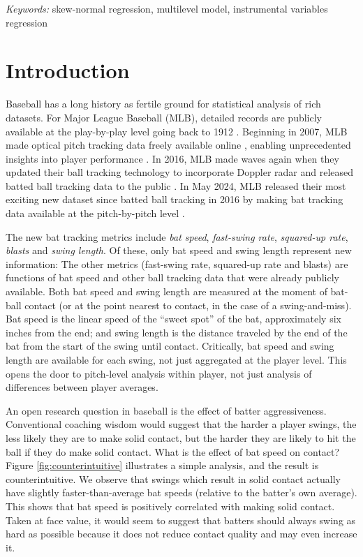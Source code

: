 \documentclass[
  12pt]{article}
\begin{document}
\noindent%
{\it Keywords:} skew-normal regression, multilevel model, instrumental variables regression
\vfill

\newpage
{} %


  \section{Introduction}
  \label{sec:introduction}

    Baseball has a long history as fertile ground for statistical analysis of rich datasets. For Major League Baseball (MLB), detailed records are publicly available at the play-by-play level going back to 1912 \citep{retrosheet_retrosheet_2025}. Beginning in 2007, MLB made optical pitch tracking data freely available online
    \citep{fast_what_2010}, enabling unprecedented insights into player performance \citep{swartz_quality_2017}. In 2016, MLB made waves again when they updated their ball tracking technology to incorporate Doppler radar and released batted ball tracking data to the public \citep{arthur_new_2016}. In May 2024, MLB released their most exciting new dataset since batted ball tracking in 2016 by making bat tracking data available at the pitch-by-pitch level \citep{petriello_everything_2024}.

    The new bat tracking metrics include {\it bat speed}, {\it fast-swing rate}, {\it squared-up rate}, {\it blasts} and {\it swing length}. Of these, only bat speed and swing length represent new information: The other metrics (fast-swing rate, squared-up rate and blasts) are functions of bat speed and other ball tracking data that were already publicly available. Both bat speed and swing length are measured at the moment of bat-ball contact (or at the point nearest to contact, in the case of a swing-and-miss). Bat speed is the linear speed of the ``sweet spot'' of the bat, approximately six inches from the end; and swing length is the distance traveled by the end of the bat from the start of the swing until contact. Critically, bat speed and swing length are available for each swing, not just aggregated at the player level. This opens the door to pitch-level analysis within player, not just analysis of differences between player averages.

    An open research question in baseball is the effect of batter aggressiveness. Conventional coaching wisdom would suggest that the harder a player swings, the less likely they are to make solid contact, but the harder they are likely to hit the ball if they do make solid contact. What is the effect of bat speed on contact? Figure \ref{fig:counterintuitive} illustrates a simple analysis, and the result is counterintuitive. We observe that swings which result in solid contact actually have slightly faster-than-average bat speeds (relative to the batter's own average). This shows that bat speed is positively correlated with making solid contact. Taken at face value, it would seem to suggest that batters should always swing as hard as possible because it does not reduce contact quality and may even increase it.
\end{document}
